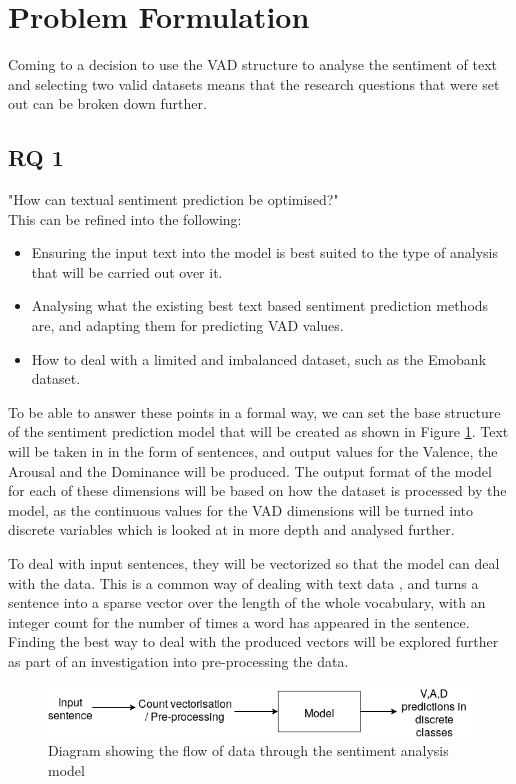 \section{Problem Formulation}

Coming to a decision to use the VAD structure to analyse the sentiment of text and selecting two valid datasets means that the research questions that were set out can be broken down further.

\subsection{RQ 1}
"How can textual sentiment prediction be optimised?" 
\\ This can be refined into the following: 

\begin{itemize}
    \item Ensuring the input text into the model is best suited to the type of analysis that will be carried out over it. 
    \item Analysing what the existing best text based sentiment prediction methods are, and adapting them for predicting VAD values. 
    \item How to deal with a limited and imbalanced dataset, such as the Emobank dataset.
\end{itemize}

To be able to answer these points in a formal way, we can set the base structure of the sentiment prediction model that will be created as shown in Figure \ref{intial:flow}. 
Text will be taken in in the form of sentences, and output values for the Valence, the Arousal and the Dominance will be produced. The output format of the model for each of these dimensions will be based on how the dataset is processed by the model, as the continuous values for the VAD dimensions will be turned into discrete variables which is looked at in more depth and analysed further.

To deal with input sentences, they will be vectorized so that the model can deal with the data. This is a common way of dealing with text data \cite{towardsDS}, and turns a sentence into a sparse vector over the length of the whole vocabulary, with an integer count for the number of times a word has appeared in the sentence. Finding the best way to deal with the produced vectors will be explored further as part of an investigation into pre-processing the data. 

\begin{figure}[h]
\centering
\includegraphics[scale=0.5]{litImgs/initialFlow.png}
\caption{Diagram showing the flow of data through the sentiment analysis model}
\label{intial:flow}
\end{figure}


